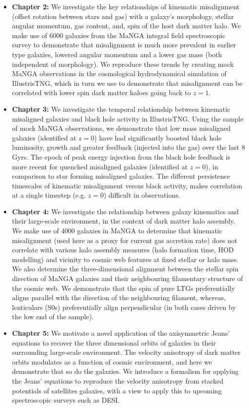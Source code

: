 \begin{itemize}
    \item \textbf{Chapter 2:} We investigate the key relationships of kinematic misalignment (offset rotation between stars and gas) with a galaxy's morphology, stellar angular momentum, gas content, and, spin of the host dark matter halo. We make use of 6000 galaxies from the MaNGA integral field spectroscopic survey to demonstrate that misalignment is much more prevalent in earlier type galaxies, lowered angular momentum and a lower gas mass (both independent of morphology). We reproduce these trends by creating mock MaNGA observations in the cosmological hydrodynamical simulation of IllustrisTNG, which in turn we use to demonstrate that misalignment can be correlated with lower spin dark matter haloes going back to $z=1$.
    
    \item \textbf{Chapter 3:} We investigate the temporal relationship between kinematic misaligned galaxies and black hole activity in IllustrisTNG. Using the sample of mock MaNGA observations, we demonstrate that low mass misaligned galaxies (identified at $z=0$) have had significantly boosted black hole luminosity, growth and greater feedback (injected into the gas) over the last 8 Gyrs. The epoch of peak energy injection from the black hole feedback is more recent for quenched misaligned galaxies (identified at $z=0$), in comparison to star forming misaligned galaxies. The different persistence timescales of kinematic misalignment versus black activity, makes correlation at a single timestep (e.g. $z=0$) difficult in observations.
    
    \item \textbf{Chapter 4:} We investigate the relationship between galaxy kinematics and their large-scale environment, in the context of dark matter halo assembly. We make use of 4000 galaxies in MaNGA to determine that kinematic misalignment (used here as a proxy for current gas accretion rate) does not correlate with various halo assembly measures (halo formation time, HOD modelling) and vicinity to cosmic web features at fixed stellar or halo mass. We also determine the three-dimensional alignment between the stellar spin direction of MaNGA galaxies and their neighbouring filamentary structure of the cosmic web. We demonstrate that the spin of pure LTGs preferentially aligns parallel with the direction of the neighbouring filament, whereas, lenticulars (S0s) preferentially align perpendicular (in both cases driven by the low end of the sample).
    
    \item \textbf{Chapter 5:} We motivate a novel application of the axisymmetric Jeans' equations to recover the three dimensional orbits of galaxies in their surrounding large-scale environment. The velocity anisotropy of dark matter orbits modulates as a function of cosmic environment, and here we demonstrate that so do the galaxies. We introduce a formalism for applying the Jeans' equations to reproduce the velocity anisotropy from stacked potentials of satellites galaxies, with a view to apply this to upcoming spectroscopic surveys such as DESI.
\end{itemize}

